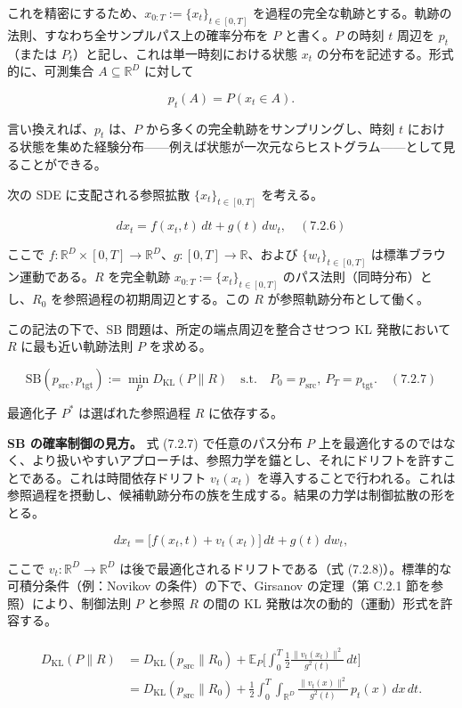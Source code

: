 これを精密にするため、$x_{0:T}:=\{x_t\}_{t\in[0,T]}$ を過程の完全な軌跡とする。軌跡の法則、すなわち全サンプルパス上の確率分布を $P$ と書く。$P$ の時刻 $t$ 周辺を $p_t$（または $P_t$）と記し、これは単一時刻における状態 $x_t$ の分布を記述する。形式的に、可測集合 $A\subseteq\mathbb{R}^D$ に対して

\[
p_t(A)=P(x_t\in A).
\]


言い換えれば、$p_t$ は、$P$ から多くの完全軌跡をサンプリングし、時刻 $t$ における状態を集めた経験分布——例えば状態が一次元ならヒストグラム——として見ることができる。

次の SDE に支配される参照拡散 $\{x_t\}_{t\in[0,T]}$ を考える。

\[
dx_t=f(x_t,t)\,dt+g(t)\,dw_t,
\quad (7.2.6)
\]


ここで $f:\mathbb{R}^D\times[0,T]\to\mathbb{R}^D$、$g:[0,T]\to\mathbb{R}$、および $\{w_t\}_{t\in[0,T]}$ は標準ブラウン運動である。$R$ を完全軌跡 $x_{0:T}:=\{x_t\}_{t\in[0,T]}$ のパス法則（同時分布）とし、$R_0$ を参照過程の初期周辺とする。この $R$ が参照軌跡分布として働く。

この記法の下で、SB 問題は、所定の端点周辺を整合させつつ KL 発散において $R$ に最も近い軌跡法則 $P$ を求める。

\[
\mathrm{SB}(p_{\mathrm{src}},p_{\mathrm{tgt}})
:=
\min_P D_{\mathrm{KL}}(P\|R)
\quad\text{s.t.}\quad
P_0=p_{\mathrm{src}},\ P_T=p_{\mathrm{tgt}}.
\quad (7.2.7)
\]


最適化子 $P^*$ は選ばれた参照過程 $R$ に依存する。

\textbf{SB の確率制御の見方。} 式 (7.2.7) で任意のパス分布 $P$ 上を最適化するのではなく、より扱いやすいアプローチは、参照力学を錨とし、それにドリフトを許すことである。これは時間依存ドリフト $v_t(x_t)$ を導入することで行われる。これは参照過程を摂動し、候補軌跡分布の族を生成する。結果の力学は制御拡散の形をとる。

\[
dx_t=\bigl[f(x_t,t)+v_t(x_t)\bigr]\,dt+g(t)\,dw_t,
\]


ここで $v_t:\mathbb{R}^D\to\mathbb{R}^D$ は後で最適化されるドリフトである（式 (7.2.8)）。標準的な可積分条件（例：Novikov の条件）の下で、Girsanov の定理（第 C.2.1 節を参照）により、制御法則 $P$ と参照 $R$ の間の KL 発散は次の動的（運動）形式を許容する。

\begin{align*}
\begin{aligned}
D_{\mathrm{KL}}(P\|R)
&=
D_{\mathrm{KL}}(p_{\mathrm{src}}\|R_0)
+\mathbb{E}_P\Biggl[\int_0^T\frac{1}{2}\frac{\|v_t(x_t)\|^2}{g^2(t)}\,dt\Biggr]\\
&=
D_{\mathrm{KL}}(p_{\mathrm{src}}\|R_0)
+\frac{1}{2}\int_0^T\int_{\mathbb{R}^D}\frac{\|v_t(x)\|^2}{g^2(t)}\,p_t(x)\,dx\,dt.
\end{aligned}
\end{align*}


